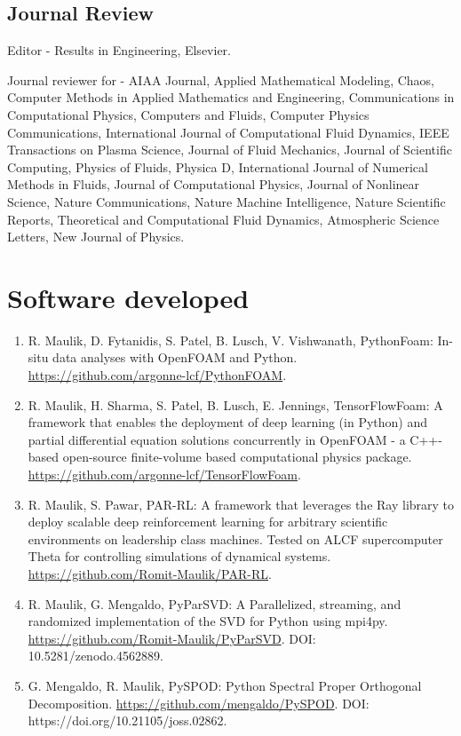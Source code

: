 \documentclass[letterpaper]{article}
\renewenvironment{itemize}{
  \begin{list}{}{
    \setlength{\leftmargin}{1.5em}
  }
}{
  \end{list}
}
\begin{document}
\subsection*{Journal Review}

\begin{itemize}
  \item Editor - Results in Engineering, Elsevier.
  \item Journal reviewer for - AIAA Journal, Applied Mathematical Modeling, Chaos, Computer Methods in Applied Mathematics and Engineering, Communications in Computational Physics, Computers and Fluids, Computer Physics Communications, International Journal of Computational Fluid Dynamics, IEEE Transactions on Plasma Science, Journal of Fluid Mechanics, Journal of Scientific Computing, Physics of Fluids, Physica D, International Journal of Numerical Methods in Fluids, Journal of Computational Physics, Journal of Nonlinear Science, Nature Communications, Nature Machine Intelligence, Nature Scientific Reports, Theoretical and Computational Fluid Dynamics, Atmospheric Science Letters, New Journal of Physics.
\end{itemize}

\section*{Software developed}

\begin{enumerate}

\item R. Maulik, D. Fytanidis, S. Patel, B. Lusch, V. Vishwanath, PythonFoam: In-situ data analyses with OpenFOAM and Python. \url{https://github.com/argonne-lcf/PythonFOAM}.

\item R. Maulik, H. Sharma, S. Patel, B. Lusch, E. Jennings, TensorFlowFoam: A framework that enables the deployment of deep learning (in Python) and partial differential equation solutions concurrently in OpenFOAM - a C++-based open-source finite-volume based computational physics package. \url{https://github.com/argonne-lcf/TensorFlowFoam}.

\item R. Maulik, S. Pawar, PAR-RL: A framework that leverages the Ray library to deploy scalable deep reinforcement learning for arbitrary scientific environments on leadership class machines. Tested on ALCF supercomputer Theta for controlling simulations of dynamical systems. \url{https://github.com/Romit-Maulik/PAR-RL}.

\item R. Maulik, G. Mengaldo, PyParSVD: A Parallelized, streaming, and randomized implementation of the SVD for Python using mpi4py. \url{https://github.com/Romit-Maulik/PyParSVD}. DOI: 10.5281/zenodo.4562889.

\item G. Mengaldo, R. Maulik, PySPOD: Python Spectral Proper Orthogonal Decomposition. \url{https://github.com/mengaldo/PySPOD}.  DOI: https://doi.org/10.21105/joss.02862.

\end{enumerate}
\end{document}
